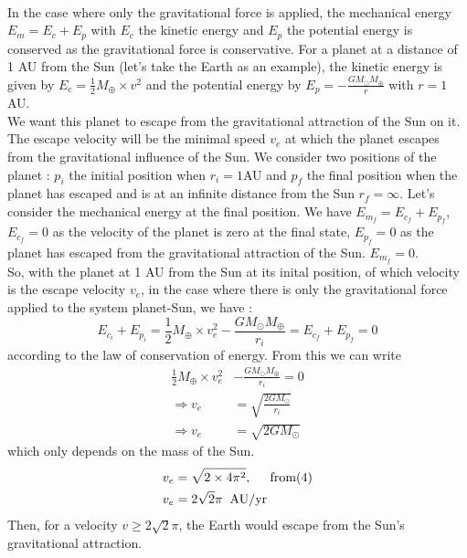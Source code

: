 \documentclass[a4paper, twoside, 11pt]{report}
\theoremstyle{theorem}
\theoremstyle{remark}
\theoremstyle{exemple}
\begin{document}
            \paragraph{}In the case where only the gravitational force is applied, the mechanical energy $E_m = E_c + E_p$ with $E_c$ the kinetic energy and $E_p$ the potential energy is conserved as the gravitational force is conservative. For a planet at a distance of 1 AU from the Sun (let's take the Earth as an example), the kinetic energy is given by $E_c = \frac{1}{2}M_{\oplus}\times v^2$ and the potential energy by $E_p = - \frac{G M_{\odot} M_{\oplus}}{r}$ with $r=1$ AU.\\ 
            We want this planet to escape from the gravitational attraction of the Sun on it. The escape velocity will be the minimal speed $v_e$ at which the planet escapes from the gravitational influence of the Sun. We consider two positions of the planet : $p_i$ the initial position when $r_i=1$AU and $p_f$ the final position when the planet has escaped and is at an infinite distance from the Sun $r_f=\infty$. Let's consider the mechanical energy at the final position. We have $E_{m_f} = E_{c_f} + E_{p_f}$, $E_{c_f} = 0$ as the velocity of the planet is zero at the final state, $E_{p_f}=0$ as the planet has escaped from the gravitational attraction of the Sun. $E_{m_f}=0$. \\
            So, with the planet at 1 AU from the Sun at its inital position, of which velocity is the escape velocity $v_e$, in the case where there is only the gravitational force applied to the system planet-Sun, we have :
                \begin{equation*}
                    E_{c_i} + E_{p_i} = \frac{1}{2}M_{\oplus} \times v_e^2 - \frac{GM_{\odot}M_{\oplus}}{r_i} = E_{c_f} + E_{p_f} = 0
                \end{equation*}
            according to the law of conservation of energy. From this we can write
                \begin{align*}
                    \frac{1}{2}M_{\oplus} \times v_e^2 &- \frac{GM_{\odot}M_{\oplus}}{r_i} = 0 \\
                    \Rightarrow v_e &= \sqrt{\frac{2GM_{\odot}}{r_i}} \\
                    \Rightarrow v_e &=\sqrt{2GM_{\odot}}
                \end{align*}
            which only depends on the mass of the Sun. 
                \begin{align*}
                    v_e &= \sqrt{2\times 4\pi^2}, \hspace{0.5cm} \mathrm{from (4)}\\
                    v_e &= 2\sqrt{2}\pi \hspace{0.2cm} \mathrm{AU/yr}
                \end{align*}
            Then, for a velocity $v \geq 2\sqrt{2}\pi$, the Earth would escape from the Sun's gravitational attraction. 
                        
\end{document}

